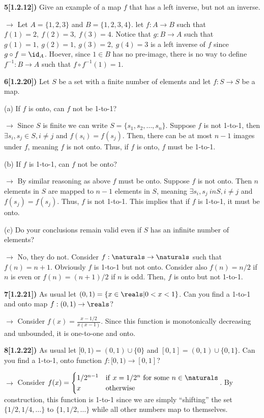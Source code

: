 \documentclass[12pt,a4paper]{article}
\newcommand{\prob}[2]{\textbf{#1)} #2}
\begin{document}
\prob{5[1.2.12]}{Give an example of a map $f$ that has a left inverse, but not an inverse.}

$\rightarrow$ Let $A = \{1,2,3\}$ and $B = \{1,2,3,4\}$. let $f: A \rightarrow B$ such that $f(1) = 2,~f(2)=3,~f(3)=4$. Notice that $g: B \rightarrow A$ such that $g(1)=1,~g(2)=1,~g(3)=2,~g(4)=3$ is a left inverse of $f$ since $g \circ f = \id_{A}$. Hoever, since $1 \in B$ has no pre-image, there is no way to define $f^{-1}: B \rightarrow A$ such that $f \circ f^{-1}(1) = 1$.

\prob{6[1.2.20]}{Let $S$ be a set with a finite number of elements and let $f: S \rightarrow S$ be a map.}

(a) If $f$ is onto, can $f$ not be 1-to-1?

$\rightarrow$ Since $S$ is finite we can write $S = \{s_1,s_2,\hdots,s_n\}$. Suppose $f$ is not 1-to-1, then $\exists s_i, s_j \in S, i \not= j$ and $f(s_i) = f(s_j)$. Then, there can be at most $n-1$ images under $f$, meaning $f$ is not onto. Thus, if $f$ is onto, $f$ must be 1-to-1.

(b) If $f$ is 1-to-1, can $f$ not be onto?

$\rightarrow$ By similar reasoning as above $f$ must be onto. Suppose $f$ is not onto. Then $n$ elements in $S$ are mapped to $n-1$ elements in $S$, meaning $\exists s_i,s_j \ in S, i \not= j$ and $f(s_j) = f(s_j)$. Thus, $f$ is not 1-to-1. This implies that if $f$ is 1-to-1, it must be onto.

(c) Do your conclusions remain valid even if $S$ has an infinite number of elements?

$\rightarrow$ No, they do not. Consider $f: \naturals \rightarrow \naturals$ such that $f(n) = n+1$. Obviously $f$ is 1-to-1 but not onto. Consider also $f(n) = n/2$ if $n$ is even or $f(n) = (n+1)/2$ if $n$ is odd. Then, $f$ is onto but not 1-to-1.

\prob{7[1.2.21]}{As usual let $(0,1) = \{x \in \reals | 0 < x < 1\}$. Can you find a 1-to-1 and onto map $f: (0,1) \rightarrow \reals$?}

$\rightarrow$ Consider $f(x) = \frac{x-1/2}{x(x-1)}$. Since this function is monotonically decreasing and unbounded, it is one-to-one and onto.

\prob{8[1.2.22]}{As usual let $[0,1) = (0,1)\cup\{0\}$ and $[0,1] = (0,1)\cup\{0,1\}$. Can you find a 1-to-1, onto function $f: [0,1) \rightarrow [0,1]$?}

$\rightarrow$ Consider $f(x) = \begin{cases} 1/2^{n-1} & {\rm if~} x = 1/2^{n} {\rm ~for~some~} n \in \naturals \\ x & {\rm otherwise}\end{cases}$. By construction, this function is 1-to-1 since we are simply ``shifting'' the set $\{1/2,1/4,\hdots\}$ to $\{1,1/2,\hdots\}$ while all other numbers map to themselves. 
\end{document}
